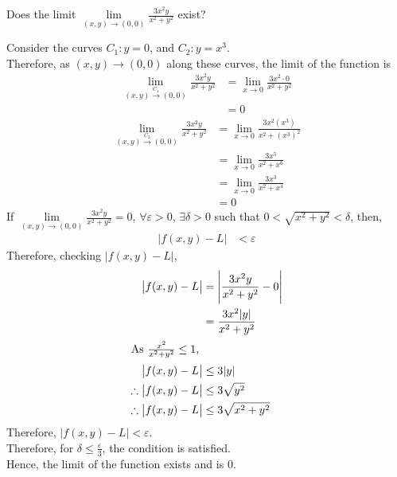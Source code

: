 \documentclass[fleqn, a4paper, 12pt, twoside]{article}
\theoremstyle{definition}
\theoremstyle{theorem}
\begin{document}
{\begin{question}
	Does the limit $\lim\limits_{(x,y) \to (0,0)} \frac{3 x^2 y}{x^2 + y^2}$ exist?
\end{question}

\begin{solution}
	Consider the curves $C_1 : y = 0$, and $C_2 : y = x^3$.\\
	Therefore, as $(x,y) \to (0,0)$ along these curves, the limit of the function is
	\begin{align*}
		\lim\limits_{(x,y) \xrightarrow{C_1} (0,0)} \frac{3 x^2 y}{x^2 + y^2} & = \lim\limits_{x \to 0} \frac{3 x^2 \cdot 0}{x^2 + y^2} \\
                                                                                      & = 0
	\end{align*}
	\begin{align*}
		\lim\limits_{(x,y) \xrightarrow{C_2} (0,0)} \frac{3 x^2 y}{x^2 + y^2} & = \lim\limits_{x \to 0} \frac{3 x^2 (x^3)}{x^2 + (x^3)^2} \\
                                                                                      & = \lim\limits_{x \to 0} \frac{3 x^5}{x^2 + x^6}           \\
                                                                                      & = \lim\limits_{x \to 0} \frac{3 x^3}{x^2 + x^4}           \\
                                                                                      & = 0
	\end{align*}
	If $\lim\limits_{(x,y) \to (0,0)} \frac{3 x^2 y}{x^2 + y^2} = 0$, $\forall \varepsilon > 0$, $\exists \delta > 0$ such that $0 < \sqrt{x^2 + y^2} < \delta$, then,
	\begin{align*}
		|f(x,y) - L| & < \varepsilon
	\end{align*}
	Therefore, checking $|f(x,y) - L|$,
	\begin{align*}
		\left| f(x,y) - L \right|            & = \left| \frac{3 x^2 y}{x^2 + y^2} - 0 \right| \\
                                                     & = \frac{3 x^2 |y|}{x^2 + y^2}                  \\
		\intertext{As $\frac{x^2}{x^2 + y^2} \le 1$,}
		\left| f(x,y) - L \right|            & \le 3 |y|                                      \\
		\therefore \left| f(x,y) - L \right| & \le 3 \sqrt{y^2}                               \\
		\therefore \left| f(x,y) - L \right| & \le 3 \sqrt{x^2 + y^2}
	\end{align*}
	Therefore, $|f(x,y) - L| < \varepsilon$.\\
	Therefore, for $\delta \le \frac{\varepsilon}{3}$, the condition is satisfied.\\
	Hence, the limit of the function exists and is $0$.
\end{solution}

}
\end{document}
